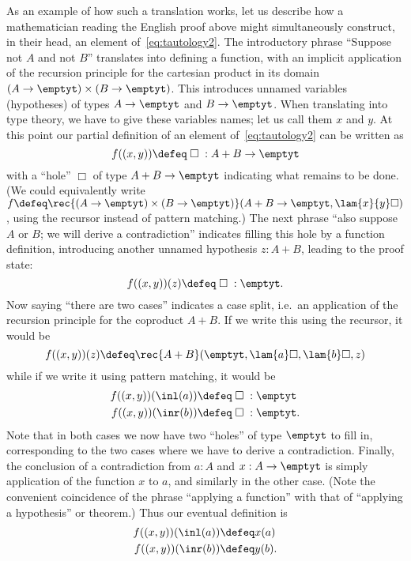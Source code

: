 As an example of how such a translation works, let us describe how a mathematician reading the English proof above might simultaneously construct, in their head, an element of~\eqref{eq:tautology2}.
The introductory phrase ``Suppose not $A$ and not $B$'' translates into defining a function, with an implicit application of the recursion principle for the cartesian product in its domain $(A\to\emptyt)\times (B\to\emptyt)$.
This introduces unnamed variables
%
(hypotheses)
%
of types $A\to\emptyt$ and $B\to\emptyt$.
When translating into type theory, we have to give these variables names; let us call them $x$ and $y$.
At this point our partial definition of an element of~\eqref{eq:tautology2} can be written as
\[ f((x,y)) \defeq\; \Box\;:A+B\to\emptyt \]
with a ``hole'' $\Box$ of type $A+B\to\emptyt$ indicating what remains to be done.
(We could equivalently write $f \defeq \rec{(A\to\emptyt)\times (B\to\emptyt)}(A+B\to\emptyt,\lam{x}{y} \Box)$, using the recursor instead of pattern matching.)
The next phrase ``also suppose $A$ or $B$; we will derive a contradiction'' indicates filling this hole by a function definition, introducing another unnamed hypothesis $z:A+B$, leading to the proof state:
\[ f((x,y))(z) \defeq \;\Box\; :\emptyt. \]
Now saying ``there are two cases'' indicates a case split, i.e.\ an application of the recursion principle for the coproduct $A+B$.
If we write this using the recursor, it would be
\[ f((x,y))(z) \defeq \rec{A+B}(\emptyt,\lam{a} \Box,\lam{b}\Box,z) \]
while if we write it using pattern matching, it would be
\begin{align*}
  f((x,y))(\inl(a)) &\defeq \;\Box\;:\emptyt\\
  f((x,y))(\inr(b)) &\defeq \;\Box\;:\emptyt.
\end{align*}
Note that in both cases we now have two ``holes'' of type $\emptyt$ to fill in, corresponding to the two cases where we have to derive a contradiction.
Finally, the conclusion of a contradiction from $a:A$ and $x:A\to\emptyt$ is simply application of the function $x$ to $a$, and similarly in the other case.
%
(Note the convenient coincidence of the phrase ``applying a function'' with that of ``applying a hypothesis'' or theorem.)
Thus our eventual definition is
\begin{align*}
  f((x,y))(\inl(a)) &\defeq x(a)\\
  f((x,y))(\inr(b)) &\defeq y(b).
\end{align*}

